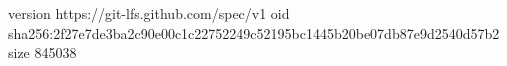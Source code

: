 version https://git-lfs.github.com/spec/v1
oid sha256:2f27e7de3ba2c90e00c1c22752249c52195bc1445b20be07db87e9d2540d57b2
size 845038
